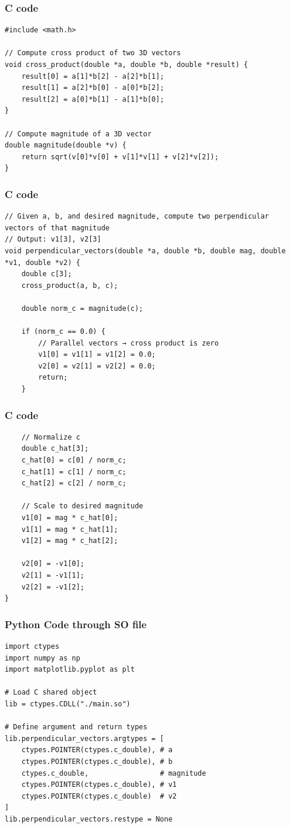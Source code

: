 \documentclass{beamer}
\begin{document}
\begin{frame}[fragile]
\frametitle{C code}
\begin{lstlisting}
#include <math.h>

// Compute cross product of two 3D vectors
void cross_product(double *a, double *b, double *result) {
    result[0] = a[1]*b[2] - a[2]*b[1];
    result[1] = a[2]*b[0] - a[0]*b[2];
    result[2] = a[0]*b[1] - a[1]*b[0];
}

// Compute magnitude of a 3D vector
double magnitude(double *v) {
    return sqrt(v[0]*v[0] + v[1]*v[1] + v[2]*v[2]);
}
\end{lstlisting}
\end{frame}
\begin{frame}[fragile]
\frametitle{C code}
\begin{lstlisting}
// Given a, b, and desired magnitude, compute two perpendicular vectors of that magnitude
// Output: v1[3], v2[3]
void perpendicular_vectors(double *a, double *b, double mag, double *v1, double *v2) {
    double c[3];
    cross_product(a, b, c);

    double norm_c = magnitude(c);

    if (norm_c == 0.0) { 
        // Parallel vectors → cross product is zero
        v1[0] = v1[1] = v1[2] = 0.0;
        v2[0] = v2[1] = v2[2] = 0.0;
        return;
    }
\end{lstlisting}
\end{frame}
\begin{frame}[fragile]
\frametitle{C code}
\begin{lstlisting}
    // Normalize c
    double c_hat[3];
    c_hat[0] = c[0] / norm_c;
    c_hat[1] = c[1] / norm_c;
    c_hat[2] = c[2] / norm_c;

    // Scale to desired magnitude
    v1[0] = mag * c_hat[0];
    v1[1] = mag * c_hat[1];
    v1[2] = mag * c_hat[2];

    v2[0] = -v1[0];
    v2[1] = -v1[1];
    v2[2] = -v1[2];
}
\end{lstlisting}
\end{frame}

\begin{frame}[fragile]
\frametitle{Python Code through SO file}
\begin{lstlisting}
import ctypes
import numpy as np
import matplotlib.pyplot as plt

# Load C shared object
lib = ctypes.CDLL("./main.so")

# Define argument and return types
lib.perpendicular_vectors.argtypes = [
    ctypes.POINTER(ctypes.c_double), # a
    ctypes.POINTER(ctypes.c_double), # b
    ctypes.c_double,                 # magnitude
    ctypes.POINTER(ctypes.c_double), # v1
    ctypes.POINTER(ctypes.c_double)  # v2
]
lib.perpendicular_vectors.restype = None
\end{lstlisting}
\end{frame}
\end{document}
